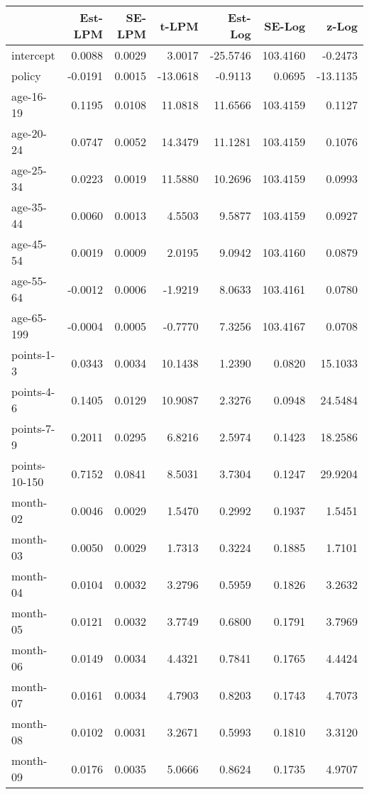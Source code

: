 \documentclass[10pt]{article}
\begin{document}
\begin{table}[ht]
\centering
\begin{tabular}{lrrrrrr}
  \hline
 & Est-LPM & SE-LPM & t-LPM & Est-Log & SE-Log & z-Log \\ 
  \hline
intercept & 0.0088 & 0.0029 & 3.0017 & -25.5746 & 103.4160 & -0.2473 \\ 
  policy & -0.0191 & 0.0015 & -13.0618 & -0.9113 & 0.0695 & -13.1135 \\ 
  age-16-19 & 0.1195 & 0.0108 & 11.0818 & 11.6566 & 103.4159 & 0.1127 \\ 
  age-20-24 & 0.0747 & 0.0052 & 14.3479 & 11.1281 & 103.4159 & 0.1076 \\ 
  age-25-34 & 0.0223 & 0.0019 & 11.5880 & 10.2696 & 103.4159 & 0.0993 \\ 
  age-35-44 & 0.0060 & 0.0013 & 4.5503 & 9.5877 & 103.4159 & 0.0927 \\ 
  age-45-54 & 0.0019 & 0.0009 & 2.0195 & 9.0942 & 103.4160 & 0.0879 \\ 
  age-55-64 & -0.0012 & 0.0006 & -1.9219 & 8.0633 & 103.4161 & 0.0780 \\ 
  age-65-199 & -0.0004 & 0.0005 & -0.7770 & 7.3256 & 103.4167 & 0.0708 \\ 
  points-1-3 & 0.0343 & 0.0034 & 10.1438 & 1.2390 & 0.0820 & 15.1033 \\ 
  points-4-6 & 0.1405 & 0.0129 & 10.9087 & 2.3276 & 0.0948 & 24.5484 \\ 
  points-7-9 & 0.2011 & 0.0295 & 6.8216 & 2.5974 & 0.1423 & 18.2586 \\ 
  points-10-150 & 0.7152 & 0.0841 & 8.5031 & 3.7304 & 0.1247 & 29.9204 \\ 
  month-02 & 0.0046 & 0.0029 & 1.5470 & 0.2992 & 0.1937 & 1.5451 \\ 
  month-03 & 0.0050 & 0.0029 & 1.7313 & 0.3224 & 0.1885 & 1.7101 \\ 
  month-04 & 0.0104 & 0.0032 & 3.2796 & 0.5959 & 0.1826 & 3.2632 \\ 
  month-05 & 0.0121 & 0.0032 & 3.7749 & 0.6800 & 0.1791 & 3.7969 \\ 
  month-06 & 0.0149 & 0.0034 & 4.4321 & 0.7841 & 0.1765 & 4.4424 \\ 
  month-07 & 0.0161 & 0.0034 & 4.7903 & 0.8203 & 0.1743 & 4.7073 \\ 
  month-08 & 0.0102 & 0.0031 & 3.2671 & 0.5993 & 0.1810 & 3.3120 \\ 
  month-09 & 0.0176 & 0.0035 & 5.0666 & 0.8624 & 0.1735 & 4.9707 \\ 

\end{tabular}
\end{table}
\end{document}
